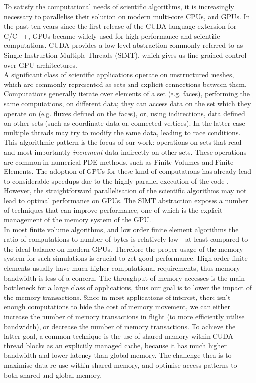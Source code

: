 To satisfy the computational needs of scientific algorithms, it is increasingly
necessary to parallelise their solution on modern multi-core CPUs, and GPUs. In
the past ten years since the first release of the CUDA language extension for
C/C++, GPUs became widely used for high performance and scientific
computations. CUDA provides a low level abstraction commonly referred to as
Single Instruction Multiple Threads (SIMT), which gives us fine grained control
over GPU architectures. \\
A significant class of scientific applications operate on unstructured meshes,
which are commonly represented as sets and explicit connections between them. Computations generally iterate over elements of a set (e.g. faces), performing the same computations, on different data; they can
access data on the set which they operate on (e.g. fluxes defined on the faces), or, using indirections, data
defined on other sets (such as coordinate data on connected vertices). In the latter case multiple threads may try to modify
the same data, leading to race conditions. This algorithmic pattern is the
focus of our work: operations on sets that read and most importantly
\emph{increment} data indirectly on other sets. These operations are common in
numerical PDE methods, such as Finite Volumes and Finite Elements. The adoption
of GPUs for these kind of computations has already lead to considerable speedups due
to the highly parallel execution of the code \cite{Reguly2015,ELSEN200810148,cohen2009fast}. However, the straightforward
parallelisation of the scientific algorithms may not lead to optimal
performance on GPUs. The SIMT abstraction exposes a number of techniques that
can improve performance, one of which is the explicit management of the memory
system of the GPU.\\

In most finite volume algorithms, and low order finite element algorithms the ratio of computations to number of bytes is relatively low - at least compared to the ideal balance on modern GPUs. Therefore the proper usage of the memory system for such simulations is crucial to get good performance. High order finite elements usually have much higher computational requirements, thus memory bandwidth is less of a concern.
The throughput of memory accesses is the main bottleneck for a large class of applications, thus our goal is to lower the impact of
the memory transactions. Since in most applications of interest, there isn't enough computations to hide the cost of memory movement, we can either increase the number of memory transactions in
flight (to more efficiently utilise bandwidth), or decrease the number of
memory transactions. To achieve the latter goal, a common technique is the use of
shared memory within CUDA thread blocks as an explicitly managed cache, because it
has much higher bandwidth and lower latency than global memory. The challenge then is to maximise data re-use within shared memory, and optimise access patterns to both shared and global memory.

